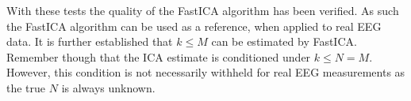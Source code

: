 \noindent
With these tests the quality of the FastICA algorithm has been verified. 
As such the FastICA algorithm can be used as a reference, when applied to real EEG data. 
It is further established that $k \leq M$ can be estimated by FastICA. 
Remember though that the ICA estimate is conditioned under $k \leq N = M$.
However, this condition is not necessarily withheld for real EEG measurements as the true $N$ is always unknown.  